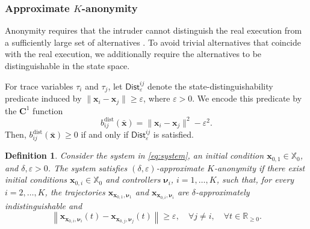 \documentclass[journal,twoside,web]{ieeecolor}
\newtheorem{definition}[theorem]{Definition}
\begin{document}
\subsubsection{Approximate $K$-anonymity}

Anonymity requires that the intruder cannot distinguish the real execution from a sufficiently large set of alternatives \cite{yin2016}. To avoid trivial alternatives that coincide with the real execution, we additionally require the alternatives to be distinguishable in the state space.

For trace variables $\tau_i$ and $\tau_j$, let $\mathsf{Dist}_{\varepsilon}^{ij}$ denote the state-distinguishability predicate induced by $\| \mathbf{x}_i - \mathbf{x}_j \| \ge \varepsilon$, where $\varepsilon > 0$. We encode this predicate by the $\mathbf{C}^1$ function
\begin{equation} \label{eq:dist_cbf}
    b_{ij}^{\mathrm{dist}}(\bar{\mathbf{x}}) = \| \mathbf{x}_i - \mathbf{x}_j\|^2 - \varepsilon^2 .
\end{equation}
Then, $b_{ij}^{\mathrm{dist}}(\bar{\mathbf{x}})\ge 0$ if and only if $\mathsf{Dist}_{\varepsilon}^{ij}$ is satisfied.
\begin{definition} \label{def:k_anonymity}
    Consider the system in \eqref{eq:system}, an initial condition $\mathbf{x}_{0,1} \in \mathbb{X}_0$, and $\delta, \varepsilon > 0$. The system satisfies \emph{$(\delta, \varepsilon)$-approximate $K$-anonymity} if there exist initial conditions $\mathbf{x}_{0,i} \in \mathbb{X}_0$ and controllers $\boldsymbol{\nu}_i$, $i = 1, \ldots, K$, such that, for every $i = 2, \dots, K$, the trajectories $\mathbf{x}_{\mathbf{x}_{0,1},\boldsymbol{\nu}_1}$ and $\mathbf{x}_{\mathbf{x}_{0,i},\boldsymbol{\nu}_i}$ are $\delta$-approximately indistinguishable and
    \[
    \left\| \mathbf{x}_{\mathbf{x}_{0,i}, \boldsymbol{\nu}_i}(t) - \mathbf{x}_{\mathbf{x}_{0,j}, \boldsymbol{\nu}_j}(t) \right\| \ge \varepsilon, \quad \forall j \neq i, \quad \forall t \in \mathbb{R}_{\ge 0}.
    \]
\end{definition}
\end{document}
